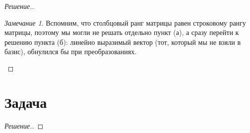 \documentclass[a4paper]{article}
\theoremstyle{remark}
\newtheorem{remark}{Замечание}
\begin{document}
\begin{proof}[Решение.]
        \begin{remark}
          Вспомним, что столбцовый ранг матрицы равен строковому рангу матрицы, поэтому
          мы могли не решать отдельно пункт (а), а сразу перейти к решению пункта (б): 
          линейно выразимый вектор (тот, который мы не взяли в базис), обнулился бы при
          преобразованиях.
        \end{remark}
      \end{proof}

    \section*{Задача }
	    \begin{proof}[Решение.]
		
        \end{proof}
\end{document}
